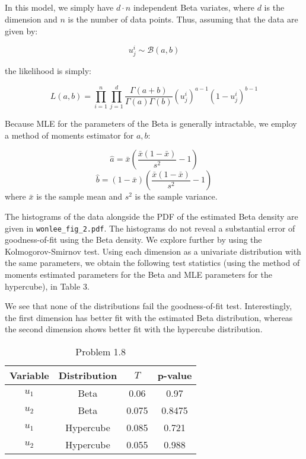 \documentclass[psamsfonts]{amsart}
\theoremstyle{definition}
\theoremstyle{remark}
\numberwithin{equation}{section}
\begin{document}
\subsection{} In this model, we simply have $d\cdot n$ independent Beta variates, where $d$ is the dimension and $n$ is the number of data points. Thus, assuming that the data are given by:

$$u^i_j \sim \mathcal{B}(a,b)$$

the likelihood is simply:

$$L(a, b) = \prod_{i=1}^n\prod_{j=1}^d \frac{\Gamma(a+b)}{\Gamma(a)\Gamma(b)} (u^i_j)^{a-1}(1-u^i_j)^{b-1}$$

Because MLE for the parameters of the Beta is generally intractable, we employ a method of moments estimator for $a,b$:

$$\hat{a} = \bar{x}\left(\frac{\bar{x}(1-\bar{x})}{s^2} - 1\right)$$
$$\hat{b} = (1-\bar{x})\left(\frac{\bar{x}(1-\bar{x})}{s^2} - 1\right)$$
where $\bar{x}$ is the sample mean and $s^2$ is the sample variance.

The histograms of the data alongside the PDF of the estimated Beta density are given in \texttt{wonlee\_fig\_2.pdf}. The histograms do not reveal a substantial error of goodness-of-fit using the Beta density. We explore further by using the Kolmogorov-Smirnov test. Using each dimension as a univariate distribution with the same parameters, we obtain the following test statistics (using the method of moments estimated parameters for the Beta and MLE parameters for the hypercube), in Table 3.

We see that none of the distributions fail the goodness-of-fit test. Interestingly, the first dimension has better fit with the estimated Beta distribution, whereas the second dimension shows better fit with the hypercube distribution.

\begin{table}[h!]
	\begin{tabular}{c|c|c|c}
		Variable & Distribution & $T$ & p-value \\\hline
		$u_1$ & Beta & 0.06 & 0.97 \\
		$u_2$ & Beta & 0.075 & 0.8475\\
		$u_1$ & Hypercube & 0.085 & 0.721\\
		$u_2$ & Hypercube & 0.055 & 0.988\\
	\end{tabular}\\
	\caption{Problem 1.8}
\end{table}
\end{document}
